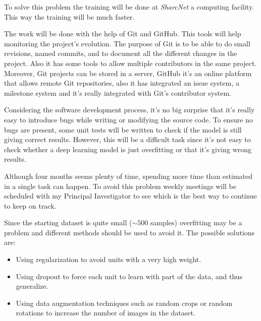 To solve this problem the training will be done at \emph{SharcNet} a computing facility. 
This way the training will be much faster.


The work will be done with the help of Git and GitHub. This tools will help monitoring
the project's evolution. The purpose of Git is to be able to do small revisions,
named commits, and to document all the different changes in the project. Also it has
some tools to allow multiple contributors in the same project. Moreover,
Git projects can be stored in a server, GitHub it's an online platform that allows
remote Git repositories, also it has integrated an issue system, a milestone system
and it's really integrated with Git's contributor system.
~\cites{tool:git}{tool:github}


Considering the software development process, it's no big surprise that it's really easy to
introduce bugs while writing or modifying the source code. To ensure no bugs are present,
some unit tests will be written to check if the model is still giving correct results.
However, this will be a difficult task since it's not easy to check whether a deep 
learning model is just overfitting or that it's giving wrong results.


Although four months seems plenty of time, spending more time than estimated in a single task
can happen. To avoid this problem weekly meetings will be scheduled with my Principal Investigator
to see which is the best way to continue to keep on track.


Since the starting dataset is quite small (\( \sim 500 \) samples) overfitting may be a problem
and different methods should be used to avoid it. The possible solutions are:
\begin{itemize}
  \item Using regularization to avoid units with a very high weight.
  \item Using dropout to force each unit to learn with part of the data, and thus generalize.
  \item Using data augmentation techniques such as random crops or random rotations to increase
  the number of images in the dataset.
\end{itemize}
